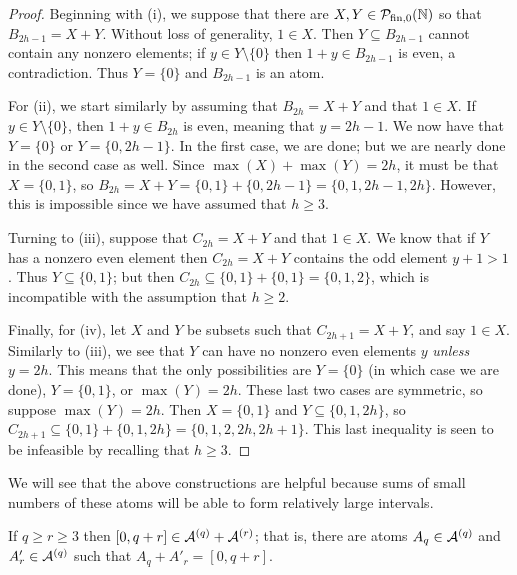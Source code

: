 \begin{proof}
	Beginning with (i), we suppose that there are $X,Y\in {\mathcal{P}_{\textrm{fin},0}(\mathbb{N})}$ so that $B_{2h-1} = X + Y$.
	Without loss of generality, $1\in X$.
	Then $Y\subseteq B_{2h-1}$ cannot contain any nonzero elements; if $y\in Y\setminus\{0\}$ then $1+y\in B_{2h-1}$ is even, a contradiction.
	Thus $Y = \{0\}$ and $B_{2h-1}$ is an atom.
	
	For (ii), we start similarly by assuming that $B_{2h} = X + Y$ and that $1\in X$.
	If $y\in Y \setminus\{0\}$, then $1+y\in B_{2h}$ is even, meaning that $y = 2h-1$.
	We now have that $Y = \{0\}$ or $Y = \{0,2h-1\}$.
	In the first case, we are done; but we are nearly done in the second case as well.  
	Since $\max(X) + \max(Y) = 2h$, it must be that $X = \{0,1\}$, so $B_{2h} = X+Y = \{0,1\} + \{0,2h-1\} = \{0,1,2h-1,2h\}$.
	However, this is impossible since we have assumed that $h\ge 3$.
	
	Turning to (iii), suppose that $C_{2h} = X + Y$ and that $1\in X$.
	We know that if $Y$ has a nonzero even element then $C_{2h} = X + Y$ contains the odd element $y+1 > 1$.
	Thus $Y \subseteq \{0,1\}$; but then $C_{2h} \subseteq \{0,1\} + \{0,1\} = \{0,1,2\}$, which is incompatible with the assumption that $h\ge 2$.
	
	Finally, for (iv), let $X$ and $Y$ be subsets such that $C_{2h+1} = X + Y$, and say $1\in X$.
	Similarly to (iii), we see that $Y$ can have no nonzero even elements $y$ \textit{unless} $y=2h$.
	This means that the only possibilities are $Y = \{0\}$ (in which case we are done), $Y = \{0,1\}$, or $\max(Y) = 2h$.
	These last two cases are symmetric, so suppose $\max(Y) = 2h$.
	Then $X = \{0,1\}$ and $Y \subseteq \{0,1,2h\}$, so $C_{2h+1} \subseteq \{0,1\} + \{0,1,2h\} = \{0,1,2,2h,2h+1\}$.
	This last inequality is seen to be infeasible by recalling that $h\ge 3$.
\end{proof}

We will see that the above constructions are helpful because sums of small numbers of these atoms will be able to form relatively large intervals.

\begin{lemma} \label{lem:two-part types}
	If $q\ge r \ge 3$ then $[ 0, q+r ] \in \mathcal{A}^{(q)} + \mathcal{A}^{(r)}$; that is, there are atoms $A_q\in \mathcal{A}^{(q)}$ and $A'_r\in \mathcal{A}^{(q)}$ such that $A_q + A'_r = [ 0,q+r ]$.
\end{lemma}

